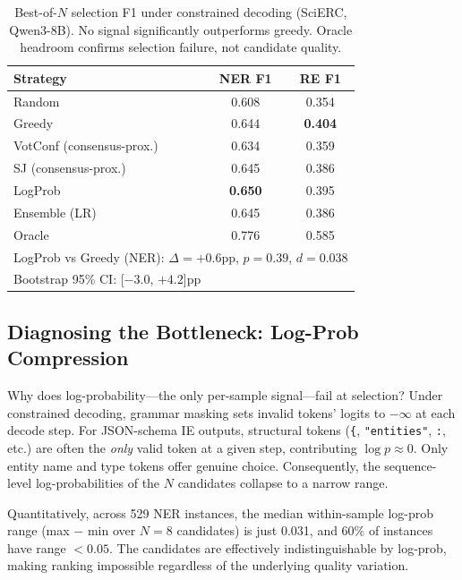 \documentclass[11pt,a4paper]{article}
\newcommand{\bmark}[1]{\textbf{#1}}
\begin{document}
\begin{table}[t]
\centering
\caption{Best-of-$N$ selection F1 under constrained decoding (SciERC, Qwen3-8B). No signal significantly outperforms greedy. Oracle headroom confirms selection failure, not candidate quality.}
\label{tab:selection_constrained}
\small
\begin{tabular}{l cc}
\toprule
Strategy & NER F1 & RE F1 \\
\midrule
Random   & 0.608 & 0.354 \\
Greedy   & 0.644 & \bmark{0.404} \\
\midrule
VotConf (consensus-prox.)  & 0.634 & 0.359 \\
SJ (consensus-prox.)       & 0.645 & 0.386 \\
LogProb                    & \bmark{0.650} & 0.395 \\
Ensemble (LR)              & 0.645 & 0.386 \\
\midrule
Oracle                     & 0.776 & 0.585 \\
\midrule
\multicolumn{3}{l}{\small LogProb vs Greedy (NER): $\Delta = +0.6$pp, $p = 0.39$, $d = 0.038$} \\
\multicolumn{3}{l}{\small Bootstrap 95\% CI: [$-3.0$, $+4.2$]pp} \\
\bottomrule
\end{tabular}
\end{table}

\subsection{Diagnosing the Bottleneck: Log-Prob Compression}
\label{sec:diagnosis}

Why does log-probability---the only per-sample signal---fail at selection? Under constrained decoding, grammar masking sets invalid tokens' logits to $-\infty$ at each decode step. For JSON-schema IE outputs, structural tokens (\texttt{\{}, \texttt{"entities"}, \texttt{:}, etc.) are often the \emph{only} valid token at a given step, contributing $\log p \approx 0$. Only entity name and type tokens offer genuine choice. Consequently, the sequence-level log-probabilities of the $N$ candidates collapse to a narrow range.

Quantitatively, across 529 NER instances, the median within-sample log-prob range (max $-$ min over $N = 8$ candidates) is just 0.031, and 60\% of instances have range $< 0.05$. The candidates are effectively indistinguishable by log-prob, making ranking impossible regardless of the underlying quality variation.
\end{document}
